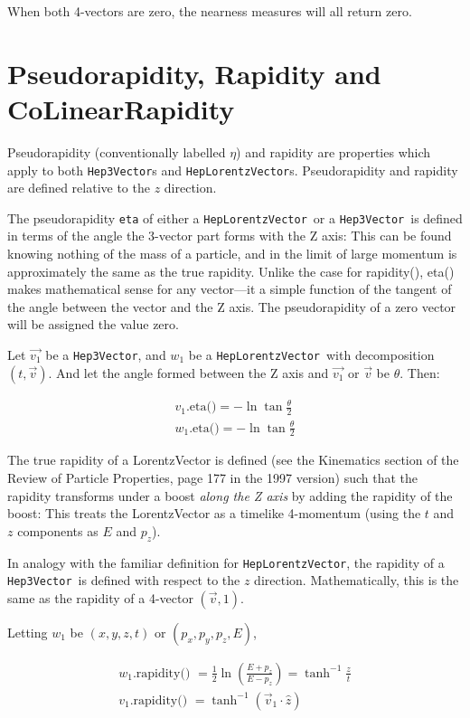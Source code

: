 \documentclass[twoside,12pt]{article}
\def \SV {{\tt Hep3Vector}}
\def \LV {{\tt HepLorentzVector}}
\begin{document}
When both 4-vectors are zero, the nearness measures will all return zero.

\section {Pseudorapidity, Rapidity and CoLinearRapidity}
\label{rapidity}

\noindent
Pseudorapidity (conventionally labelled $\eta$) and rapidity are properties
which apply to both \SV s and \LV s.
Pseudorapidity and rapidity are defined relative to the $z$ direction.

The pseudorapidity {\tt eta} of either a \LV\ or a \SV\ is defined in terms of
the angle the 3-vector part forms with the Z axis:
This can be found knowing nothing of the mass of a particle, and
in the limit of large momentum is approximately the same as the true rapidity.
Unlike the case for rapidity(), eta() makes mathematical sense for any
vector---it a simple function of the tangent of the angle between the vector and
the Z axis.
The pseudorapidity of a zero vector will be assigned the value zero.

Let $\vec{v_1}$ be a \SV, and $w_1$ be a \LV\ with decomposition
$(t, \vec{v})$.
And let the angle formed between the Z axis and
$\vec{v_1}$ or $\vec{v}$ be $\theta$.  Then:

\begin{eqnarray}
\label{eq:eta:3}
  v_1 \mbox{.eta()} = - \ln \tan \frac{\theta}{2} \\
\label{eq:weta:3}
  w_1 \mbox{.eta()} = - \ln \tan \frac{\theta}{2}
\end{eqnarray}


\noindent
The true rapidity of a LorentzVector is defined (see the Kinematics section of
the Review of Particle Properties, page 177 in the 1997 version) such that
the rapidity transforms under a boost {\em along the Z axis}
by adding the rapidity of the boost:
This treats the LorentzVector as a timelike 4-momentum
(using the $t$ and $z$ components as $E$ and $p_z$).

In analogy with the familiar definition for \LV, the rapidity of a \SV\ is
defined with respect to the $z$ direction.
Mathematically, this is the same as the rapidity of a 4-vector
$(\vec{v}, 1)$.

Letting $w_1$ be $(x, y, z, t)$ or $(p_x, p_y, p_z, E)$,

\begin{eqnarray}
\label{eq:wrapid:3}
  w_1 \mbox{.rapidity() }
	= \frac{1}{2} \ln \left( \frac{E + p_z}{E - p_z}    \right)
	= \tanh^{-1} \frac {z}{t} \\
  v_1 \mbox{.rapidity() }
	= \tanh^{-1} (\vec{v}_1 \cdot \hat{z})
\end{eqnarray}
\end{document}
